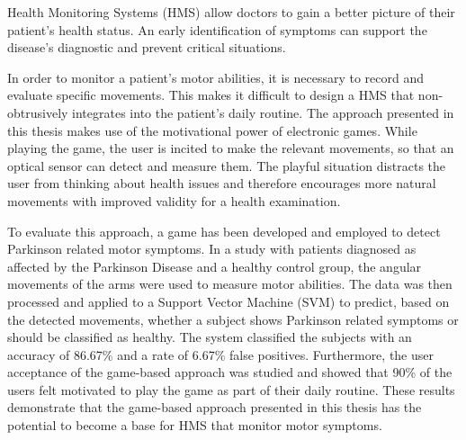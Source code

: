 Health Monitoring Systems (HMS) allow doctors to gain a better picture of their patient’s health status. An early identification of symptoms can support the disease's diagnostic and prevent critical situations.

In order to monitor a patient’s motor abilities, it is necessary to record and evaluate specific movements. This makes it difficult to design a HMS that non-obtrusively integrates into the patient’s daily routine. The approach presented in this thesis makes use of the motivational power of electronic games. While playing the game, the user is incited to make the relevant movements, so that an optical sensor can detect and measure them. The playful situation distracts the user from thinking about health issues and therefore encourages more natural movements with improved validity for a health examination.

To evaluate this approach, a game has been developed and employed to detect Parkinson related motor symptoms.  In a study with patients diagnosed as affected by the Parkinson Disease and a healthy control group, the angular movements of the arms were used to measure motor abilities. The data was then processed and applied to a Support Vector Machine (SVM) to predict, based on the detected movements, whether a subject shows Parkinson related symptoms or should be classified as healthy. The system classified the subjects with an accuracy of 86.67\% and a rate of 6.67\% false positives. Furthermore, the user acceptance of the game-based approach was studied and showed that 90\% of the users felt motivated to play the game as part of their daily routine. These results demonstrate that the game-based approach presented in this thesis has the potential to become a base for HMS that monitor motor symptoms.
